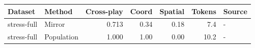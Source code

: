 \begin{tabular}{llrrrrl}
\toprule
Dataset & Method & Cross-play & Coord & Spatial & Tokens & Source \\
\midrule
stress-full & Mirror & 0.713 & 0.34 & 0.18 & 7.4 & - \\
stress-full & Population & 1.000 & 1.00 & 0.00 & 10.2 & - \\
\bottomrule
\end{tabular}
